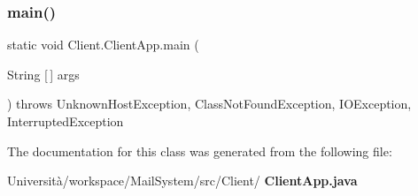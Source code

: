 \subsubsection{main()}
{\footnotesize\ttfamily static void Client.\+Client\+App.\+main (\begin{DoxyParamCaption}\item[{String [$\,$]}]{args }\end{DoxyParamCaption}) throws Unknown\+Host\+Exception, Class\+Not\+Found\+Exception, I\+O\+Exception, Interrupted\+Exception\hspace{0.3cm}{\ttfamily [static]}}



The documentation for this class was generated from the following file\+:\begin{DoxyCompactItemize}
\item 
Università/workspace/\+Mail\+System/src/\+Client/\textbf{ Client\+App.\+java}\end{DoxyCompactItemize}
